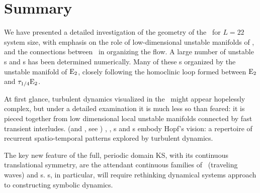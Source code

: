 
\section{Summary}
\label{sect:rpo-sum}

We have presented a detailed investigation
of the geometry of the
{\KS} \statesp\ for $L=22$ system size, with emphasis on the role of
low-dimensional unstable manifolds of \eqva,
 and the connections between \eqva\ in organizing the flow.
A large number of unstable \rpo s and \po s has been determined
numerically.
Many of these \rpo s
 organized by the unstable manifold of $\mathrm{E}_{2}$, closely
following the homoclinic loop formed between $\mathrm{E}_{2}$ and $\tau_{1/4}\mathrm{E}_{2}$.


At first glance, turbulent dynamics visualized in the \statesp\ might appear
hopelessly complex, but under a detailed examination it is
much less so than feared: it is
pieced together from low dimensional %
local unstable manifolds connected by fast transient interludes.
{\KS} (and \pCf, see )  \eqva, \reqva, \po s and
\rpo s embody Hopf's vision:
a repertoire of recurrent spatio-temporal
patterns explored by turbulent dynamics.


The key new feature of the full, periodic domain
KS, with its continuous translational symmetry,
are the attendant continuous families of
\reqva\ (traveling waves) and \rpo s.
\Rpo s, in particular, will require rethinking dynamical systems
approach to constructing symbolic dynamics.




